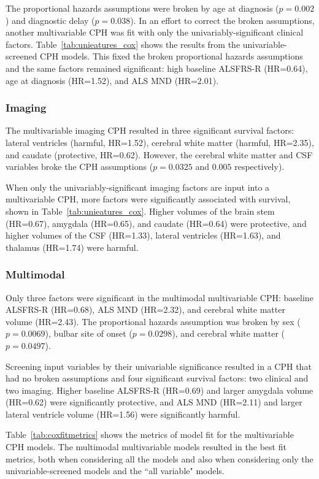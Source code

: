 The proportional hazards assumptions were broken by age at diagnosis ($p=0.002$) and diagnostic delay ($p=0.038$).
In an effort to correct the broken assumptions, another multivariable CPH was fit with only the univariably-significant clinical factors.
Table~\ref{tab:unieatures_cox} shows the results from the univariable-screened CPH models.
This fixed the broken proportional hazards assumptions and the same factors remained significant: high baseline ALSFRS-R (HR=0.64), age at diagnosis (HR=1.52), and ALS MND (HR=2.01).


\subsubsection{Imaging}
The multivariable imaging CPH resulted in three significant survival factors: lateral ventricles (harmful, HR=1.52), cerebral white matter (harmful, HR=2.35), and caudate (protective, HR=0.62).
However, the cerebral white matter and CSF variables broke the CPH assumptions ($p=0.0325$ and $0.005$ respectively).

When only the univariably-significant imaging factors are input into a multivariable CPH, more factors were significantly associated with survival, shown in Table~\ref{tab:unieatures_cox}.
Higher volumes of the brain stem (HR=0.67), amygdala (HR=0.65), and caudate (HR=0.64) were protective, and higher volumes of the CSF (HR=1.33), lateral ventricles (HR=1.63), and thalamus (HR=1.74) were harmful.

\subsubsection{Multimodal}
Only three factors were significant in the multimodal multivariable CPH: baseline ALSFRS-R (HR=0.68), ALS MND (HR=2.32), and cerebral white matter volume (HR=2.43).
The proportional hazards assumption was broken by sex ($p=0.0069$), bulbar site of onset ($p=0.0298$), and cerebral white matter ($p=0.0497$).

Screening input variables by their univariable significance resulted in a CPH that had no broken assumptions and four significant survival factors: two clinical and two imaging.
Higher baseline ALSFRS-R (HR=0.69) and larger amygdala volume (HR=0.62) were significantly protective, and ALS MND (HR=2.11) and larger lateral ventricle volume (HR=1.56) were significantly harmful.

Table~\ref{tab:coxfitmetrics} shows the metrics of model fit for the multivariable CPH models.
The multimodal multivariable models resulted in the best fit metrics, both when considering all the models and also when considering only the univariable-screened models and the ``all variable" models.

